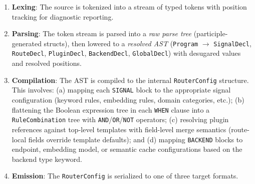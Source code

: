 \begin{enumerate}
  \item \textbf{Lexing}: The source is tokenized into a stream of typed tokens with position tracking for diagnostic reporting.
  \item \textbf{Parsing}: The token stream is parsed into a \emph{raw parse tree} (participle-generated structs), then lowered to a \emph{resolved AST} (\texttt{Program} $\to$ \texttt{SignalDecl}, \texttt{RouteDecl}, \texttt{PluginDecl}, \texttt{BackendDecl}, \texttt{GlobalDecl}) with desugared values and resolved positions.
  \item \textbf{Compilation}: The AST is compiled to the internal \texttt{RouterConfig} structure. This involves: (a) mapping each \texttt{SIGNAL} block to the appropriate signal configuration (keyword rules, embedding rules, domain categories, etc.); (b) flattening the Boolean expression tree in each \texttt{WHEN} clause into a \texttt{RuleCombination} tree with \texttt{AND}/\texttt{OR}/\texttt{NOT} operators; (c) resolving plugin references against top-level templates with field-level merge semantics (route-local fields override template defaults); and (d) mapping \texttt{BACKEND} blocks to endpoint, embedding model, or semantic cache configurations based on the backend type keyword.
  \item \textbf{Emission}: The \texttt{RouterConfig} is serialized to one of three target formats.
\end{enumerate}

